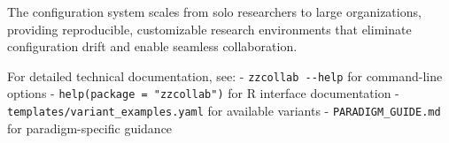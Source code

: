 \documentclass[
]{article}
\begin{document}
The configuration system scales from solo researchers to large
organizations, providing reproducible, customizable research
environments that eliminate configuration drift and enable seamless
collaboration.

For detailed technical documentation, see: - \texttt{zzcollab\ -\/-help}
for command-line options - \texttt{help(package\ =\ "zzcollab")} for R
interface documentation - \texttt{templates/variant\_examples.yaml} for
available variants - \texttt{PARADIGM\_GUIDE.md} for paradigm-specific
guidance
\end{document}
